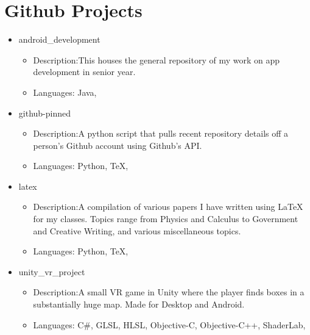 \documentclass{article}%
\begin{document}
%
\normalsize%
\section{Github Projects}%
\label{sec:Github Projects}%
\begin{itemize}%
\item%
android\_development%
\begin{itemize}%
\item%
Description:This houses the general repository of my work on app development in senior year.%
\item%
Languages: Java, %
\end{itemize}%
\end{itemize}%
\begin{itemize}%
\item%
github{-}pinned%
\begin{itemize}%
\item%
Description:A python script that pulls recent repository details off a person's Github account using Github's API. %
\item%
Languages: Python, TeX, %
\end{itemize}%
\end{itemize}%
\begin{itemize}%
\item%
latex%
\begin{itemize}%
\item%
Description:A compilation of various papers I have written using LaTeX for my classes. Topics range from Physics and Calculus to Government and Creative Writing, and various miscellaneous topics. %
\item%
Languages: Python, TeX, %
\end{itemize}%
\end{itemize}%
\begin{itemize}%
\item%
unity\_vr\_project%
\begin{itemize}%
\item%
Description:A small VR game in Unity where the player finds boxes in a substantially huge map. Made for Desktop and Android.%
\item%
Languages: C\#, GLSL, HLSL, Objective{-}C, Objective{-}C++, ShaderLab, %
\end{itemize}%
\end{itemize}

%
\end{document}
